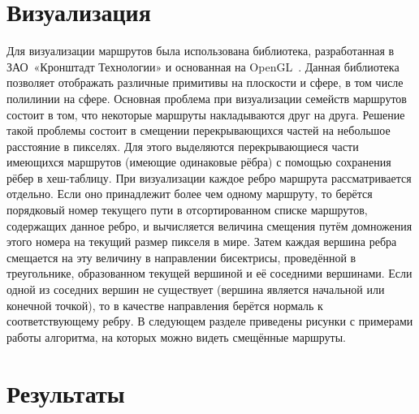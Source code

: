 \FloatBarrier

\section{Визуализация}

\label{sec:visualization-impl}

Для визуализации маршрутов была использована библиотека, разработанная в
ЗАО~«Кронштадт Технологии» и основанная на OpenGL~\cite{opengl}. Данная
библиотека позволяет отображать различные примитивы на плоскости и
сфере, в том числе полилинии на сфере. Основная проблема при
визуализации семейств маршрутов состоит в том, что некоторые маршруты
накладываются друг на друга. Решение такой проблемы состоит в смещении
перекрывающихся частей на небольшое расстояние в пикселях. Для этого
выделяются перекрывающиеся части имеющихся маршрутов (имеющие
одинаковые рёбра) с помощью сохранения рёбер в хеш-таблицу. При
визуализации каждое ребро маршрута рассматривается отдельно. Если оно
принадлежит более чем одному маршруту, то берётся порядковый номер
текущего пути в отсортированном списке маршрутов, содержащих данное
ребро, и вычисляется величина смещения путём домножения этого номера
на текущий размер пикселя в мире. Затем каждая вершина ребра смещается
на эту величину в направлении бисектрисы, проведённой в треугольнике,
образованном текущей вершиной и её соседними вершинами. Если одной из
соседних вершин не существует (вершина является начальной или конечной
точкой), то в качестве направления берётся нормаль к соответствующему
ребру. В следующем разделе приведены рисунки с примерами работы
алгоритма, на которых можно видеть смещённые маршруты.

\FloatBarrier

\section{Результаты}

\label{sec:results}

